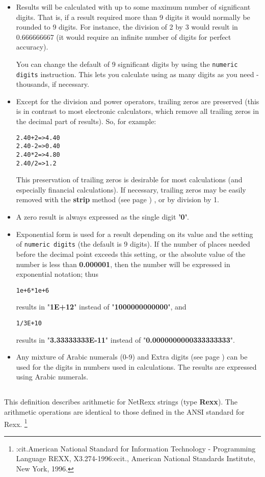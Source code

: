 \begin{itemize}
\item Results will be calculated with up to some maximum number of
significant digits.
That is, if a result required more than 9 digits it would normally be
rounded to 9 digits.
For instance, the division of 2 by 3 would result in 0.666666667 (it
would require an infinite number of digits for perfect accuracy).
 
You can change the default of 9 significant digits by using the
\texttt{numeric digits} instruction.  This lets you calculate using
as many digits as you need - thousands, if necessary.
\item Except for the division and power operators, trailing zeros are
preserved (this is in contrast to most electronic calculators, which
remove all trailing zeros in the decimal part of results).
So, for example:
\begin{alltt}
2.40 + 2  =>  4.40
2.40 - 2  =>  0.40
2.40 * 2  =>  4.80
2.40 / 2  =>  1.2
\end{alltt}
This preservation of trailing zeros is desirable for most
calculations (and especially financial calculations).
 If necessary, trailing zeros may be easily removed with the
 \textbf{strip} method (see page \pageref{refstrip}) , or by division by 1.
\item A zero result is always expressed as the single
digit \textbf{'0'}.
\item 
Exponential form is used for a result depending on its value and
the setting of \texttt{numeric digits} (the default is 9 digits).
If the number of places needed before the decimal point exceeds this
setting, or the absolute value of the number is less
than \textbf{0.000001}, then the number will be expressed in
exponential notation; thus
\begin{alltt}
1e+6 * 1e+6
\end{alltt}
results in "\textbf{1E+12}" instead of
"\textbf{1000000000000}", and
\begin{alltt}
1 / 3E+10
\end{alltt}
results in "\textbf{3.33333333E-11}" instead of
"\textbf{0.0000000000333333333}".
\item 
Any mixture of Arabic numerals (0-9) and  Extra digits (see page \pageref{refsyms}) 
can be used for the digits in numbers used in calculations.  The results
are expressed using Arabic numerals.
\end{itemize}
\subsection{}\label{"id"}
 This definition describes arithmetic for NetRexx strings
(type \textbf{Rexx}).
The arithmetic operations are identical to those defined in the ANSI
standard for Rexx.
\footnote{
:cit.American National Standard for Information Technology -
Programming Language REXX, X3.274-1996:ecit., American National
Standards Institute, New York, 1996.
}

